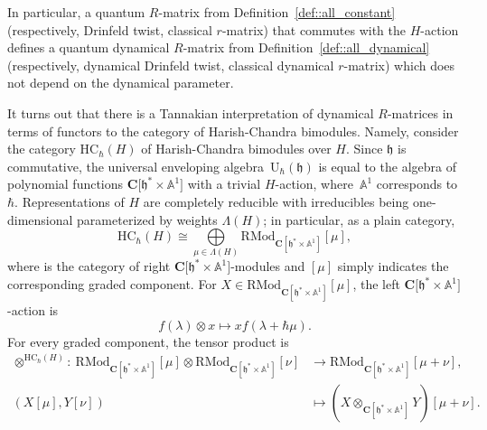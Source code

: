 \documentclass[10pt,a4paper]{article}
\numberwithin{equation}{section}
\newcommand{\C}{\mathbf{C}}
\newcommand{\U}{\mathrm{U}_{\hbar}}
\newcommand{\h}{\mathfrak{h}}
\newcommand{\HC}{\mathrm{HC}_{\hbar}}
\newcommand{\RMod}{\mathrm{RMod}}
\begin{document}
	\begin{Remark}
		In particular, a quantum $R$-matrix from Definition~\ref{def::all_constant} (respectively, Drinfeld twist, classical $r$-matrix) that commutes with the $H$-action defines a quantum dynamical $R$-matrix from Definition~\ref{def::all_dynamical} (respectively, dynamical Drinfeld twist, classical dynamical $r$-matrix) which does not depend on the dynamical parameter.
	\end{Remark}
	
	It turns out that there is a Tannakian interpretation of dynamical $R$-matrices in terms of functors to the category of Harish-Chandra bimodules. Namely, consider the category $\HC(H)$ of Harish-Chandra bimodules over $H$. Since $\h$ is commutative, the universal enveloping algebra~$\U(\h)$ is equal to the algebra of polynomial functions $\C\bigl[\h^* \times \mathbb{A}^1\bigr]$ with a trivial $H$-action, where~$\mathbb{A}^1$ corresponds to $\hbar$. Representations of $H$ are completely reducible with irreducibles being one-dimensional parameterized by weights $\Lambda(H)$; in particular, as a plain category,
	\[
	\HC(H) \cong \bigoplus\limits_{\mu \in \Lambda(H)} \RMod_{\C[\h^* \times \mathbb{A}^1]}[\mu],
	\]
	where \smash{$\RMod_{\C[\h \times \mathbb{A}^1]}$} is the category of right $\C\bigl[\h^* \times \mathbb{A}^1\bigr]$-modules and $[\mu]$ simply indicates the corresponding graded component. For $X\in \RMod_{\C[\h^* \times \mathbb{A}^1]}[\mu]$, the left $\C\bigl[\h^* \times \mathbb{A}^1\bigr]$-action is
	\begin{equation}
		\label{eq::hc_left_action}
		f(\lambda) \otimes x \mapsto x f(\lambda+\hbar \mu).
	\end{equation}
	For every graded component, the tensor product is
	\begin{align}
			\otimes^{\HC(H)}\colon\ \RMod_{\C[\h^* \times \mathbb{A}^1]} [\mu] \otimes \RMod_{\C[\h^* \times \mathbb{A}^1]} [\nu] & \rightarrow \RMod_{\C[\h^* \times \mathbb{A}^1]} [\mu+\nu],\nonumber \\
(X[\mu],Y[\nu]) & \mapsto (X \otimes_{\C[\h^* \times \mathbb{A}^1]} Y)[\mu+\nu].\label{eq::hc_h_tensor_product}
	\end{align}
	
\end{document}
